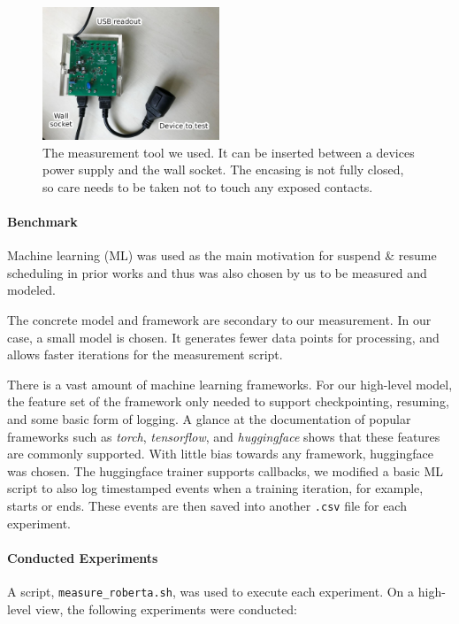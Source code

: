\begin{figure}
    \centering
    \includegraphics[width=200px]{images/mcp_graphic_design_is_my_passion.jpg}
    \caption[short]{The measurement tool we used. It can be inserted between a devices power supply and the wall socket. The encasing is not fully closed, so care needs to be taken not to touch any exposed contacts.}
    \label{fig:mcp}
\end{figure}


\paragraph{Benchmark}

Machine learning (ML) was used as the main motivation for suspend \& resume scheduling in prior works \cite {wiesner_lets_2021} and thus was also chosen by us to be measured and modeled. 

The concrete model and framework are secondary to our measurement. 
In our case, a small model  is chosen.
It generates fewer data points for processing, and allows faster iterations for the measurement script. 

There is a vast amount of machine learning frameworks. 
For our high-level model, the feature set of the framework only needed to support checkpointing, resuming, and some basic form of logging. 
A glance at the documentation of popular frameworks such as \emph{torch}, \emph{tensorflow}, and \emph{huggingface} shows that these features are commonly supported. 
With little bias towards any framework, huggingface was chosen.
The huggingface trainer supports callbacks, we modified a basic ML script to also log timestamped events when a training iteration, for example, starts or ends. 
These events are then saved into another \verb|.csv| file for each experiment.

\paragraph{Conducted Experiments}

A script, \verb|measure_roberta.sh|, was used to execute each experiment. 
On a high-level view, the following experiments were conducted: 

